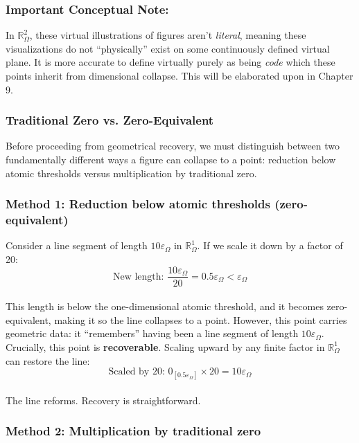 \documentclass{article}
\begin{document}
\subsubsection*{Important Conceptual Note:}

In $\mathbb{R}_\Omega^2$, these virtual illustrations of figures aren't \textit{literal}, meaning these visualizations do not ``physically'' exist on some continuously defined virtual plane. It is more accurate to define virtually purely as being \textit{code} which these points inherit from dimensional collapse. This will be elaborated upon in Chapter 9. 
 
\subsubsection{Traditional Zero vs. Zero-Equivalent}

Before proceeding from geometrical recovery, we must distinguish between two fundamentally different ways a figure can collapse to a point: reduction below atomic thresholds versus multiplication by traditional zero.

\subsubsection*{Method 1: Reduction below atomic thresholds (zero-equivalent)}

Consider a line segment of length $10\varepsilon_\Omega$ in $\mathbb{R}_\Omega^1$. If we scale it down by a factor of 20:
$$\text{New length: } \frac{10\varepsilon_\Omega}{20} = 0.5\varepsilon_\Omega < \varepsilon_\Omega$$
\\This length is below the one-dimensional atomic threshold, and it becomes zero-equivalent, making it so the line collapses to a point. However, this point carries geometric data: it ``remembers'' having been a line segment of length $10\varepsilon_\Omega$. Crucially, this point is \textbf{recoverable}. Scaling upward by any finite factor in $\mathbb{R}_\Omega^1$ can restore the line:
$$\text{Scaled by 20: } 0_{[0.5\varepsilon_\Omega]} \times 20 = 10\varepsilon_\Omega$$
\\The line reforms. Recovery is straightforward.

\subsubsection*{Method 2: Multiplication by traditional zero}
\end{document}
